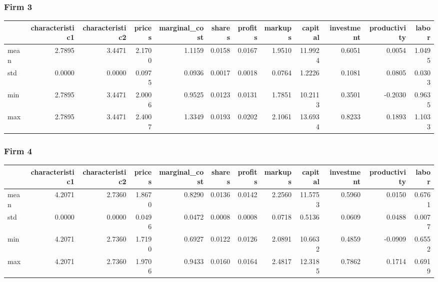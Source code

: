  \subsubsection*{Firm 3}
\begin{tabular}{lrrrrrrrrrrr}
\toprule
{} &  characteristic1 &  characteristic2 &  prices &  marginal\_cost &  shares &  profits &  markups &  capital &  investment &  productivity &  labor \\
\midrule
mean &           2.7895 &           3.4471 &  2.1700 &         1.1159 &  0.0158 &   0.0167 &   1.9510 &  11.9924 &      0.6051 &        0.0054 & 1.0495 \\
std  &           0.0000 &           0.0000 &  0.0975 &         0.0936 &  0.0017 &   0.0018 &   0.0764 &   1.2226 &      0.1081 &        0.0805 & 0.0303 \\
min  &           2.7895 &           3.4471 &  2.0006 &         0.9525 &  0.0123 &   0.0131 &   1.7851 &  10.2113 &      0.3501 &       -0.2030 & 0.9635 \\
max  &           2.7895 &           3.4471 &  2.4007 &         1.3349 &  0.0193 &   0.0202 &   2.1061 &  13.6934 &      0.8233 &        0.1893 & 1.1033 \\
\bottomrule
\end{tabular}


 \subsubsection*{Firm 4}
\begin{tabular}{lrrrrrrrrrrr}
\toprule
{} &  characteristic1 &  characteristic2 &  prices &  marginal\_cost &  shares &  profits &  markups &  capital &  investment &  productivity &  labor \\
\midrule
mean &           4.2071 &           2.7360 &  1.8670 &         0.8290 &  0.0136 &   0.0142 &   2.2560 &  11.5753 &      0.5960 &        0.0150 & 0.6761 \\
std  &           0.0000 &           0.0000 &  0.0496 &         0.0472 &  0.0008 &   0.0008 &   0.0718 &   0.5136 &      0.0609 &        0.0488 & 0.0077 \\
min  &           4.2071 &           2.7360 &  1.7190 &         0.6927 &  0.0122 &   0.0126 &   2.0891 &  10.6632 &      0.4859 &       -0.0909 & 0.6552 \\
max  &           4.2071 &           2.7360 &  1.9706 &         0.9433 &  0.0160 &   0.0164 &   2.4817 &  12.3185 &      0.7862 &        0.1714 & 0.6919 \\
\bottomrule
\end{tabular}



